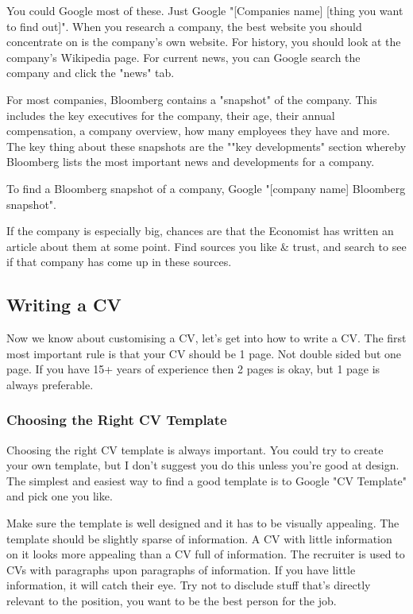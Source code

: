 \documentclass{article}
\begin{document}
You could Google most of these. Just Google "[Companies name] [thing you want to find out]". When you research a company, the best website you should concentrate on is the company's own website. For history, you should look at the company's Wikipedia page. For current
news, you can Google search the company and click the "news" tab.

For most companies, Bloomberg contains a "snapshot" of the company.
This includes the key executives for the company, their age, their
annual compensation, a company overview, how many employees they have
and more. The key thing about these snapshots are the ""key developments" section whereby Bloomberg lists the most important news
and developments for a company.

To find a Bloomberg snapshot of a company, Google "[company name] Bloomberg snapshot".

If the company is especially big, chances are that the Economist has
written an article about them at some point. Find sources you like \&
trust, and search to see if that company has come up in these sources.


\subsection{Writing a CV}
Now we know about customising a CV, let's get into how to write a CV.
The first most important rule is that your CV should be 1 page. Not
double sided but one page. If you have 15+ years of experience then 2
pages is okay, but 1 page is always preferable.
\subsubsection{Choosing the Right CV Template}
Choosing the right CV template is always important. You could try to
create your own template, but I don't suggest you do this unless you're
good at design. The simplest and easiest way to find a good template is
to Google "CV Template" and pick one you like.

Make sure the template is well designed and it has to be visually
appealing. The template should be slightly sparse of information. A CV
with little information on it looks more appealing than a CV full of
information. The recruiter is used to CVs with paragraphs upon
paragraphs of information. If you have little information, it will catch
their eye. Try not to disclude stuff that's directly relevant to the
position, you want to be the best person for the job.
\end{document}
